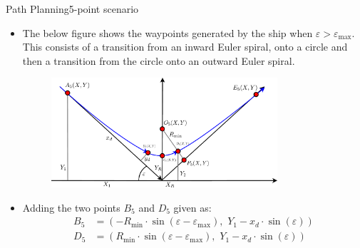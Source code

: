 \documentclass[10pt]{beamer}
\begin{document}
\begin{frame}{Path Planning}{5-point scenario}
    \begin{itemize}
    \item The below figure shows the waypoints generated by the ship when $\varepsilon > \varepsilon_\text{max}$. This consists of a transition from an inward Euler spiral, onto a circle and then a transition from the circle onto an outward Euler spiral. 
    	\begin{figure}
			\begin{center}
				\includegraphics[width=8.4cm]{img/5Points}
				\label{fig:5points}
			\end{center}
		\end{figure}
		\item Adding the two points $B_5$ and $D_5$ given as:
		\begin{align}
		B_5 &= (-R_\text{min} \cdot \sin(\varepsilon - \varepsilon _\text{max}),\,\, Y_1 - x_d \cdot \sin(\varepsilon))\\
		D_5 &= (R_\text{min} \cdot \sin(\varepsilon - \varepsilon _\text{max}),\,\, Y_1 - x_d \cdot \sin(\varepsilon))
		\end{align}
    \end{itemize}
\end{frame}
\end{document}

